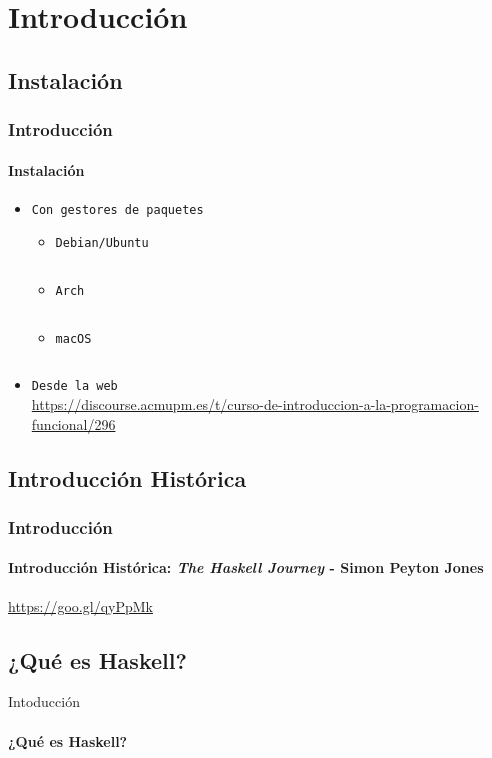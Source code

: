 \section{Introducción}
\subsection{Instalación}
\begin{frame}[fragile]
  \frametitle{Introducción}
  \framesubtitle{Instalación}
  \begin{itemize}
  \item\texttt{Con gestores de paquetes}
    \begin{itemize}
    \item\texttt{Debian/Ubuntu}
      {\color{white}
        \inputminted[bgcolor=bg]{text}{code/instalacion01.txt}
      }
    \item\texttt{Arch}
      {\color{white}
        \inputminted[bgcolor=bg]{text}{code/instalacion02.txt}
      }
    \item\texttt{macOS}
      {\color{white}
          \inputminted[bgcolor=bg]{text}{code/instalacion03.txt}
      }
    \end{itemize}
  \item\texttt{Desde la web}\\
    \url{https://discourse.acmupm.es/t/curso-de-introduccion-a-la-programacion-funcional/296}
  \end{itemize}
\end{frame}

\subsection{Introducción Histórica}
\begin{frame}[fragile]          %
  \frametitle{Introducción}
  \framesubtitle{Introducción Histórica: \textit{The Haskell Journey} - Simon Peyton Jones}
  \url{https://goo.gl/qyPpMk}
\end{frame}

\subsection{¿Qué es Haskell?}
\begin{frame}{Intoducción}      %
  \framesubtitle{¿Qué es Haskell?}
\end{frame}
